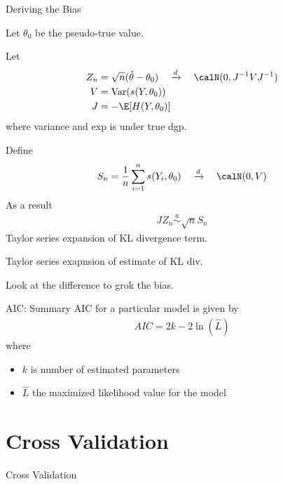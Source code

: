 \documentclass[aspectratio=169, handout]{beamer}
\newcommand{\Var}{\operatorname{Var}}
\newcommand{\dto}{\xrightarrow{d}}
\newcommand{\sumin}{\sum^n_{i=1}}
\begin{document}
{\footnotesize
\begin{frame}{Deriving the Bias}

Let $\theta_0$ be the pseudo-true value.

Let
\begin{align*}
  Z_n
  &=
  \sqrt{n}(\hat{\theta}-\theta_0)
  \quad\dto\quad
  \calN(0,J^{-1}VJ^{-1})
  \\
  V
  &=
  \Var(s(Y,\theta_0))
  \\
  J
  &=
  -\E[H(Y,\theta_0)]
\end{align*}
where variance and exp is under true dgp.

Define
\begin{align*}
  S_n = \frac{1}{n}\sumin s(Y_i,\theta_0)
  \quad\dto\quad
  \calN(0,V)
\end{align*}
As a result
\begin{align*}
  JZ_n
  \overset{a}{\sim}
  \sqrt{n}S_n
\end{align*}
Taylor series expansion of KL divergence term.

Taylor series exapnsion of estimate of KL div.

Look at the difference to grok the bias.
\end{frame}
}






{\footnotesize
\begin{frame}{AIC: Summary}
AIC for a particular model is given by
\begin{align*}
  AIC = 2k - 2\ln(\hat{L})
\end{align*}
where
\begin{itemize}
  \item $k$ is number of estimated parameters
  \item $\hat{L}$ the maximized likelihood value for the model
\end{itemize}
\end{frame}
}



\section{Cross Validation}

{\footnotesize
\begin{frame}{Cross Validation}

\end{frame}
}
\end{document}
